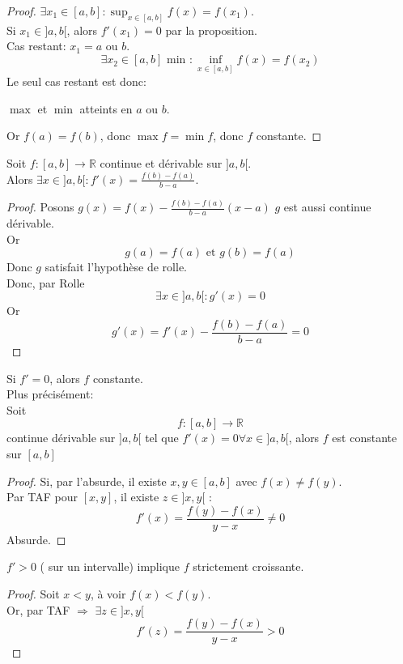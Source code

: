 \documentclass[../main.tex]{subfiles}
\begin{document}
\begin{proof}
	$\exists x_1 \in [ a,b] : \sup_{x\in [ a,b]} f( x) = f( x_1)   $.\\
	Si $x_1 \in ]a,b[$, alors $f'( x_1) = 0$ par la proposition.\\
	Cas restant: $x_1= a$ ou $b$.\\
	\[ 
		\exists x_2 \in [ a,b] \text{ min } : \inf_{x \in [ a,b] } f( x)  = f( x_2) 
	\]
	Le seul cas restant est donc:
	\begin{center}
	$\max$ et $\min$ atteints en $a$ ou $b$.
	\end{center}
	Or $f( a) = f( b)$, donc $\max f = \min f$, donc $f$ constante.
\end{proof}
\begin{thm}\label{thm:theoreme_des_accroissements_finis_taf}
	Soit $f: [ a,b] \to \mathbb{R}$ continue et dérivable sur $]a,b[$.\\
	Alors $\exists x \in ]a,b[: f'( x) = \frac{f( b) -f( a) }{b-a}$.
\end{thm}
\begin{proof}
	Posons $g( x) = f( x) - \frac{f( b) - f( a) }{b-a} ( x-a)  $ 
	$g$ est aussi continue dérivable.\\
	Or 
	\[ 
		g( a) = f( a) \text{ et } g( b) = f( a)  
	\]
	Donc $g$ satisfait l'hypothèse de rolle.\\
	Donc, par Rolle
	\[ 
		\exists x \in ]a,b[ : g'( x)  = 0
	\]
	Or 
	\[ 
		g'( x) = f'( x) - \frac{f( b) -f( a) }{b-a} = 0
	\]
	
\end{proof}
\begin{crly}
Si $f'= 0$, alors $f$ constante.\\
Plus précisément:\\
Soit
\[ 
	f:[a,b] \to \mathbb{R}
\]
continue dérivable sur $]a,b[$ tel que $f'( x) = 0 \forall x \in ]a,b[$, alors $f$ est constante sur $[a,b]$
\end{crly}
\begin{proof}
	Si, par l'absurde, il existe $x,y \in [ a,b] $ avec $f( x) \neq f( y) $.\\
	Par TAF pour  $[x,y]$, il existe $z \in ]x,y[$ :
\[ 
	f'( x) = \frac{f( y) - f( x) }{y-x}\neq 0
\]
Absurde.
\end{proof}
\begin{crly}
	$f'>0$ ( sur un intervalle) implique $f$ strictement croissante.
\end{crly}
\begin{proof}
	Soit $x< y$, à voir $f( x) < f( y) $.\\
	Or, par TAF $\Rightarrow$ $\exists z \in ]x,y[$ 
	\[ 
		f'( z) = \frac{f( y) -f( x) }{y-x}> 0
	\]
\end{proof}
\end{document}
